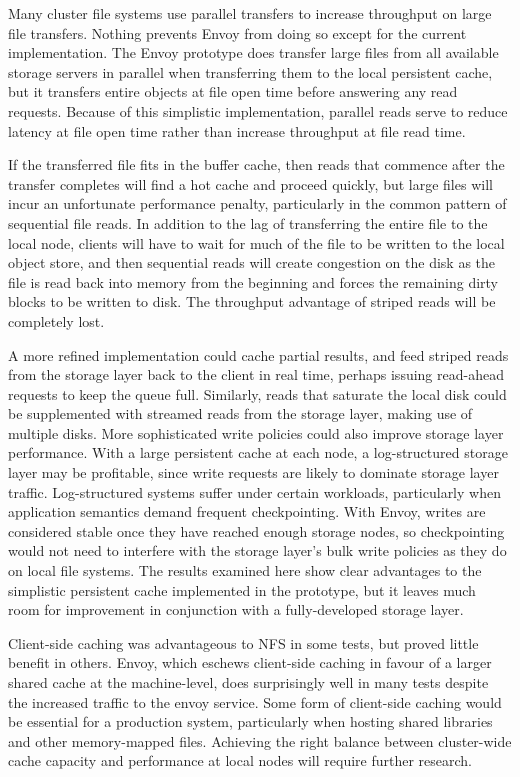 Many cluster file systems use parallel transfers to increase throughput on large file transfers. Nothing prevents Envoy from doing so except for the current implementation. The Envoy prototype does transfer large files from all available storage servers in parallel when transferring them to the local persistent cache, but it transfers entire objects at file open time before answering any read requests. Because of this simplistic implementation, parallel reads serve to reduce latency at file open time rather than increase throughput at file read time.

If the transferred file fits in the buffer cache, then reads that commence after the transfer completes will find a hot cache and proceed quickly, but large files will incur an unfortunate performance penalty, particularly in the common pattern of sequential file reads. In addition to the lag of transferring the entire file to the local node, clients will have to wait for much of the file to be written to the local object store, and then sequential reads will create congestion on the disk as the file is read back into memory from the beginning and forces the remaining dirty blocks to be written to disk. The throughput advantage of striped reads will be completely lost.

A more refined implementation could cache partial results, and feed striped reads from the storage layer back to the client in real time, perhaps issuing read-ahead requests to keep the queue full. Similarly, reads that saturate the local disk could be supplemented with streamed reads from the storage layer, making use of multiple disks. More sophisticated write policies could also improve storage layer performance. With a large persistent cache at each node, a log-structured storage layer may be profitable, since write requests are likely to dominate storage layer traffic. Log-structured systems suffer under certain workloads, particularly when application semantics demand frequent checkpointing. With Envoy, writes are considered stable once they have reached enough storage nodes, so checkpointing would not need to interfere with the storage layer's bulk write policies as they do on local file systems. The results examined here show clear advantages to the simplistic persistent cache implemented in the prototype, but it leaves much room for improvement in conjunction with a fully-developed storage layer.

Client-side caching was advantageous to NFS in some tests, but proved little benefit in others. Envoy, which eschews client-side caching in favour of a larger shared cache at the machine-level, does surprisingly well in many tests despite the increased traffic to the envoy service. Some form of client-side caching would be essential for a production system, particularly when hosting shared libraries and other memory-mapped files. Achieving the right balance between cluster-wide cache capacity and performance at local nodes will require further research.

